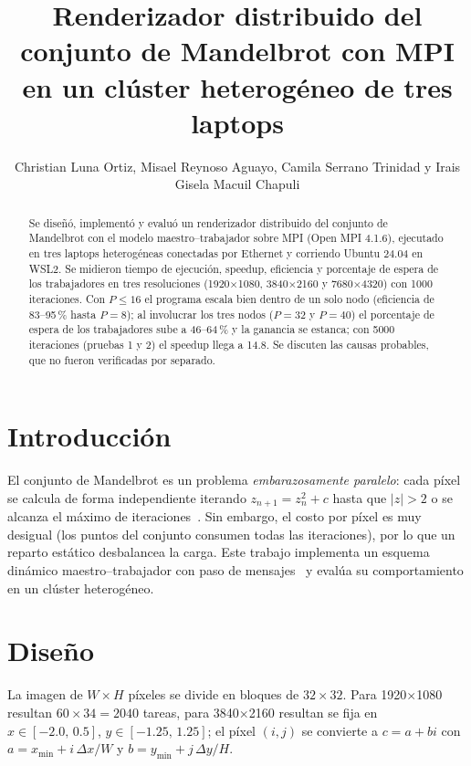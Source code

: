 \documentclass[runningheads]{llncs}
\begin{document}
\title{Renderizador distribuido del conjunto de Mandelbrot con MPI en un cl\'uster heterog\'eneo de tres laptops}
\author{Christian Luna Ortiz, Misael Reynoso Aguayo, Camila Serrano Trinidad y Irais Gisela Macuil Chapuli}
\maketitle

\begin{abstract}
Se dise\~n\'o, implement\'o y evalu\'o un renderizador distribuido del conjunto de Mandelbrot con el modelo
maestro--trabajador sobre MPI (Open MPI 4.1.6), ejecutado en tres laptops heterog\'eneas conectadas por Ethernet
y corriendo Ubuntu 24.04 en WSL2. Se midieron tiempo de ejecuci\'on, speedup, eficiencia y porcentaje de espera de los
trabajadores en tres resoluciones (1920$\times$1080, 3840$\times$2160 y 7680$\times$4320) con 1000 iteraciones.
Con $P\le 16$ el programa escala bien dentro de un solo nodo (eficiencia de 83--95\,\% hasta $P=8$); al involucrar
los tres nodos ($P=32$ y $P=40$) el porcentaje de espera de los trabajadores sube a 46--64\,\% y la ganancia se
estanca; con 5000 iteraciones (pruebas 1 y 2) el speedup llega a 14.8. Se discuten las causas probables, que no fueron verificadas por separado.
\end{abstract}

\section{Introducci\'on}
El conjunto de Mandelbrot es un problema \emph{embarazosamente paralelo}: cada p\'ixel se calcula de forma
independiente iterando $z_{n+1}=z_n^2+c$ hasta que $|z|>2$ o se alcanza el m\'aximo de iteraciones~\cite{mandelbrot}.
Sin embargo, el costo por p\'ixel es muy desigual (los puntos del conjunto consumen todas las iteraciones), por lo que un
reparto est\'atico desbalancea la carga. Este trabajo implementa un esquema din\'amico maestro--trabajador con paso de
mensajes~\cite{gropp} y eval\'ua su comportamiento en un cl\'uster heterog\'eneo.

\section{Dise\~no}
La imagen de $W\times H$ p\'ixeles se divide en bloques de $32\times 32$. Para 1920$\times$1080 resultan
$60\times 34=2040$ tareas, para 3840$\times$2160 resultan %
se fija en $x\in[-2.0,\,0.5]$, $y\in[-1.25,\,1.25]$; el p\'ixel $(i,j)$ se convierte a $c=a+bi$ con
$a=x_{\min}+i\,\Delta x/W$ y $b=y_{\min}+j\,\Delta y/H$.
\end{document}
